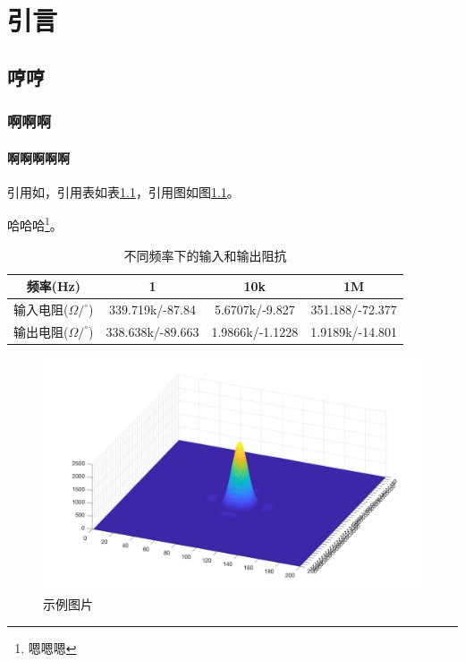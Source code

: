 \chapter{引言}

\section{哼哼}
\subsection{啊啊啊}
\subsubsection{啊啊啊啊啊}

引用如，引用表如表\ref{tab:input_output_r}，引用图如图\ref{fig:sample}。

哈哈哈\footnote{嗯嗯嗯}。

\begin{table}[h]
    \small
    \centering
    \caption{不同频率下的输入和输出阻抗}
    \label{tab:input_output_r}
    \begin{tabular}{cccc}
        \toprule %
        频率(Hz) & 1 & 10k & 1M \\
        \midrule
        输入电阻($\Omega/^\circ$) & 339.719k/-87.84 & 5.6707k/-9.827 & 351.188/-72.377\\
        输出电阻($\Omega/^\circ$) & 338.638k/-89.663 & 1.9866k/-1.1228 & 1.9189k/-14.801 \\
        \bottomrule
    \end{tabular}
\end{table}

\begin{figure}[h]
    \centering
    \includegraphics[width=12cm]{figures/Sample.jpg}
    \caption{示例图片}
    \label{fig:sample}
\end{figure}
